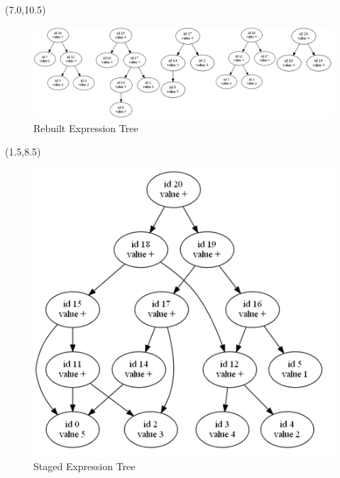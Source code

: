 \documentclass[landscape]{a0poster}
\begin{document}
\begin{textblock}{30}


\begin{textblock}{29}(7.0,10.5)
	\begin{figure}	
		\centering
			\includegraphics[scale=1.4]{tree1_rebuild.png}
			\caption{\large Rebuilt Expression Tree}
			
	\end{figure}
\end{textblock}

\begin{textblock}{14}(1.5,8.5)
	\begin{figure}
		
	\centering
			\includegraphics[scale=1.9]{tree1_staged.png}
			\caption{\large Staged Expression Tree}
		\end{figure}


\end{textblock}
\end{textblock}
\end{document}

